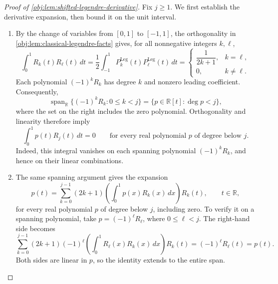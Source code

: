 \documentclass[11pt]{article}
\begin{document}
\begin{proof}[Proof of \cref{obj:lem:shifted-legendre-derivative}]
Fix \(j\ge1\). We first establish the derivative expansion, then bound it on the unit interval.

\begin{enumerate}
\item By the change of variables from \([0,1]\) to \([-1,1]\), the orthogonality in \cref{obj:lem:classical-legendre-facts} gives, for all nonnegative integers \(k,\ell\),
\[
\int_0^1 R_k(t)R_\ell(t)\,dt
=\frac12\int_{-1}^1
P_k^{\mathrm{Leg}}(t)P_\ell^{\mathrm{Leg}}(t)\,dt
=
\begin{cases}
\dfrac{1}{2k+1},&k=\ell,\\
0,&k\ne\ell.
\end{cases}
\]
Each polynomial \((-1)^kR_k\) has degree \(k\) and nonzero leading coefficient. Consequently,
\[
\operatorname{span}_{\mathbb R}\{(-1)^kR_k:0\le k<j\}
=
\{p\in\mathbb R[t]:\deg p<j\},
\]
where the set on the right includes the zero polynomial. Orthogonality and linearity therefore imply
\[
\int_0^1 p(t)R_j(t)\,dt=0
\qquad
\text{for every real polynomial \(p\) of degree below \(j\)}.
\]
Indeed, this integral vanishes on each spanning polynomial \((-1)^kR_k\), and hence on their linear combinations.

\item The same spanning argument gives the expansion
\[
p(t)=
\sum_{k=0}^{j-1}(2k+1)
\left(\int_0^1p(x)R_k(x)\,dx\right)R_k(t),
\qquad t\in\mathbb R,
\]
for every real polynomial \(p\) of degree below \(j\), including zero. To verify it on a spanning polynomial, take \(p=(-1)^\ell R_\ell\), where \(0\le\ell<j\). The right-hand side becomes
\[
\sum_{k=0}^{j-1}(2k+1)(-1)^\ell
\left(\int_0^1R_\ell(x)R_k(x)\,dx\right)R_k(t)
=(-1)^\ell R_\ell(t)=p(t).
\]
Both sides are linear in \(p\), so the identity extends to the entire span.


\end{enumerate}
\end{proof}
\end{document}
